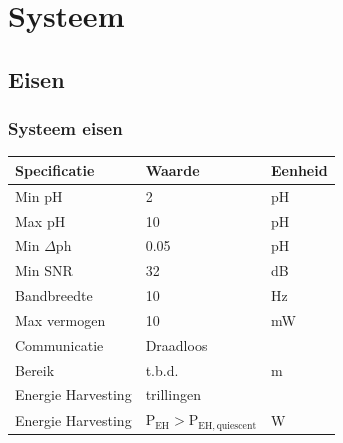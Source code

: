 \section{Systeem}
    \subsection*{Eisen}
    \begin{frame}
        \frametitle{Systeem eisen}
    
        \begin{table}[h]
            \centering
            \begin{tabular}{l|l|l}
                Specificatie        & Waarde        & Eenheid   \\\hline
                Min pH              & 2             & pH        \\
                Max pH              & 10            & pH        \\
                Min $\Delta$ph      & 0.05          & pH        \\
                Min SNR             & 32            & dB        \\\hline
                Bandbreedte         & 10            & Hz        \\\hline
                Max vermogen        & 10            & mW        \\\hline
                Communicatie        & Draadloos     &           \\
                Bereik              & t.b.d.        & m         \\\hline
                Energie Harvesting  & trillingen    &           \\ 
                Energie Harvesting  & $\mathrm{P}_{\mathrm{EH}} > \mathrm{P}_{\mathrm{EH,quiescent}}$ & W         \\
            \end{tabular}
        \end{table}
    
    \end{frame}
    
